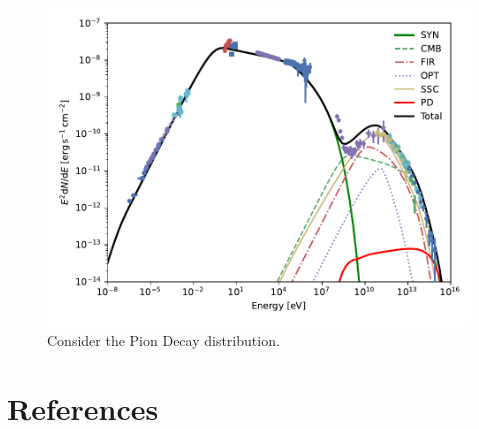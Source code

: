 \documentclass[9pt, mathserif]{beamer}
\begin{document}
        \begin{frame}
            \begin{figure}[t]
                \centering
                \includegraphics[width=0.8\linewidth]{SynIC-BestFitPar4.pdf}
                \caption{Consider the Pion Decay distribution.}
            \end{figure}
        \end{frame}





    \section{References}
        \begin{frame}
            
            
        \end{frame}
\end{document}
